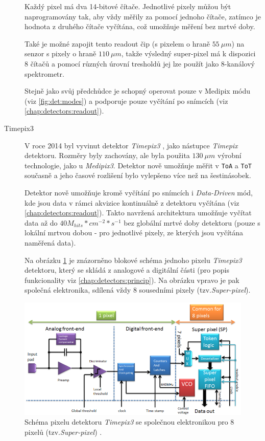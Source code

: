 \begin{description}
	Každý pixel má dva 14-bitové čítače. Jednotlivé pixely můžou být naprogramovány tak, aby vždy měřily za pomocí jednoho čítače, zatímco je hodnota z druhého čítače vyčítána, což umožňuje měření bez mrtvé doby.

	Také je možné zapojit tento readout čip (s pixelem o hraně $55~\mu m$) na senzor s pixely o hraně $110~\mu m$, takže výsledný super-pixel má k dispozici 8 čítačů a pomocí různých úrovní tresholdů jej lze použít jako 8-kanálový spektrometr.

	Stejně jako svůj předchůdce je schopný operovat pouze v Medipix módu (viz \ref{fig:det:modes}) a podporuje pouze vyčítání po snímcích (viz \ref{chap:detectors:readout}).

	\item[Timepix3]\label{chap:detectors:medipix_overview:timepix3} V roce 2014 byl vyvinut detektor \textit{Timepix3} \cite{timepix3}, jako nástupce \textit{Timepix} detektoru. Rozměry byly zachovány, ale byla použita $130~\mu m$ výrobní technologie, jako u \textit{Medipix3}. Detektor nově umožňuje měřit v \texttt{ToA} a \texttt{ToT} současně a jeho časové rozlišení bylo vylepšeno více než na šestinásobek.

	Detektor nově umožňuje kromě vyčítání po snímcích i \textit{Data-Driven} mód, kde jsou data v rámci akvizice kontinuálně z detektoru vyčítána (viz \ref{chap:detectors:readout}). Takto navržená architektura umožňuje vyčítat data až do $40M_{hits}*cm^{-2}*s^{-1}$ bez globální mrtvé doby detektoru (pouze s lokální mrtvou dobou - pro jednotlivé pixely, ze kterých jsou vyčítána naměřená data).

	Na obrázku \ref{fig:det:medipix_overview:timepix3_schema} je znázorněno blokové schéma jednoho pixelu \textit{Timepix3} detektoru, který se skládá z analogové a digitální části (pro popis funkcionality viz \ref{chap:detectors:princip}). Na obrázku vpravo je pak společná elektronika, sdílená vždy 8 sousedními pixely (tzv.\textit{Super-pixel}).

\end{description}

\begin{figure}
	\begin{center}
		\includegraphics[width=15cm]{figures/det_timepix3_schema.png}
		\caption{Schéma pixelu detektoru \textit{Timepix3} se společnou elektronikou pro 8 pixelů (tzv.\textit{Super-pixel}) \cite{timepix3}.}
		\label{fig:det:medipix_overview:timepix3_schema}
	\end{center}
\end{figure}

